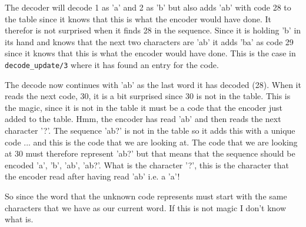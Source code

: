 \documentclass[a4paper,11pt]{article}
\begin{document}
The decoder will decode 1 as 'a' and 2 as 'b' but also adds 'ab' with
code 28 to the table since it knows that this is what the encoder
would have done.  It therefor is not surprised when it finds 28 in the
sequence. Since it is holding 'b' in its hand and knows that the next
two characters are 'ab' it adds 'ba' as code 29 since it knows that
this is what the encoder would have done. This is the case in {\tt
  decode\_update/3} where it has found an entry for the code.

The decode now continues with 'ab' as the last word it has decoded
(28). When it reads the next code, 30, it is a bit surprised since 30
is not in the table. This is the magic, since it is not in the table
it must be a code that the encoder just added to the table. Hmm, the
encoder has read 'ab' and then reads the next character '?'. The
sequence 'ab?' is not in the table so it adds this with a unique code
... and this is the code that we are looking at. The code that we are
looking at 30 must therefore represent 'ab?' but that means that the
sequence should be encoded 'a', 'b', 'ab', 'ab?'. What is the
character '?', this is the character that the encoder read after
having read 'ab' i.e. a 'a'!

So since the word that the unknown code represents must start with the
same characters that we have as our current word. If this is not magic
I don't know what is.
\end{document}
